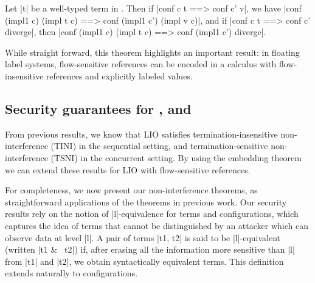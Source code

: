 

\begin{theorem}
\label{thm:eq} Let |t| be a well-typed term in \liofs{}.
  Then if |conf c t ==> conf c' v|, we have |conf (impl1 c) (impl t c)
  ==> conf (impl1 c') (impl v c)|, and if 
  |conf c t ==> conf c' diverge|, then
  |conf (impl1 c) (impl t c) ==> conf (impl1 c') diverge|.
\end{theorem}
%
While straight forward, this theorem highlights an important result: in
floating label systems, flow-sensitive references can be encoded in a calculus
with flow-insensitive references and explicitly labeled values.

\subsection{Security guarantees for \liofs{}, \lioafs{} and \lioconc{}}

From previous results, we know that LIO satisfies termination-insensitive
non-interference (TINI) in the sequential setting, and termination-sensitive
non-interference (TSNI) in the concurrent setting. By using the
embedding theorem we can extend these results for LIO with flow-sensitive references.

For completeness, we now present our
non-interference theorems, as straightforward applications of the theorems in
previous work. Our security results rely on the notion of
|l|-equivalence for terms and configurations, which captures the idea
of terms that cannot be distinguished by an attacker which can observe
data at level |l|. A pair of terms |t1, t2| is said to be
|l|-equivalent (written |t1 &~ t2|) if, after erasing all the
information more sensitive than |l| from |t1| and |t2|, we obtain
syntactically equivalent terms. This definition extends naturally to
configurations.

